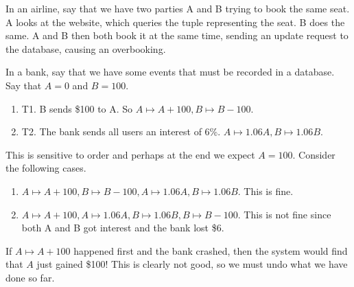 \documentclass{article}
\begin{document}
    \begin{example}
      In an airline, say that we have two parties A and B trying to book the same seat. A looks at the website, which queries the tuple representing the seat. B does the same. A and B then both book it at the same time, sending an update request to the database, causing an overbooking. 

      In a bank, say that we have some events that must be recorded in a database. Say that $A = 0$ and $B = 100$. 
      \begin{enumerate}
        \item T1. B sends \$100 to A. So $A \mapsto A + 100, B \mapsto B - 100$. 
        \item T2. The bank sends all users an interest of 6\%. $A \mapsto 1.06 A, B \mapsto 1.06B$. 
      \end{enumerate}
      This is sensitive to order and perhaps at the end we expect $A = 100$. Consider the following cases. 
      \begin{enumerate} 
        \item $A \mapsto A + 100, B \mapsto B - 100, A \mapsto 1.06A, B \mapsto 1.06B$. This is fine. 
        \item $A \mapsto A + 100, A \mapsto 1.06A, B \mapsto 1.06B, B \mapsto B - 100$. This is not fine since both A and B got interest and the bank lost \$6. 
      \end{enumerate}
    \end{example}

    \begin{example}
      If $A \mapsto A + 100$ happened first and the bank crashed, then the system would find that $A$ just gained \$100! This is clearly not good, so we must undo what we have done so far. 
    \end{example}
\end{document}
